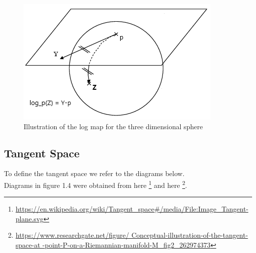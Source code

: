 \documentclass[12pt]{report}
\begin{document}
\begin{figure}[ht]
    \begin{center}
        \includegraphics[scale=0.8]{log_map.PNG}
        \caption{Illustration of the log map 
        for the three dimensional sphere}
        \label{fig:Illustration of an log Map}
    \end{center}
\end{figure}

\newpage

\subsection{Tangent Space}
To define the tangent space we refer to the diagrams below.\\
Diagrams in figure 1.4 were obtained from here
\footnote{\url{https://en.wikipedia.org/wiki/Tangent_space\#/media/File:Image_Tangent-plane.svg}}
and here
\footnote{\url{https://www.researchgate.net/figure/
Conceptual-illustration-of-the-tangent-space-at
-point-P-on-a-Riemannian-manifold-M_fig2_262974373}}.
\end{document}
